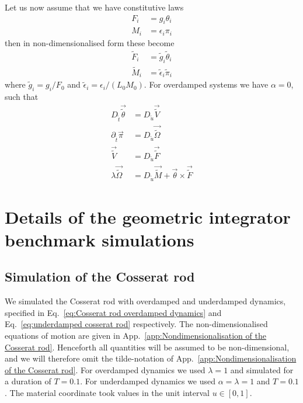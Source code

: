 \documentclass[]{cam-thesis}
\begin{document}
Let us now assume that we have constitutive laws
\begin{align*}
F_{i} & =g_{i}\theta_{i}\\
M_{i} & =\epsilon_{i}\pi_{i}
\end{align*}
then in non-dimensionalised form these become
\begin{align*}
\tilde{F}_{i} & =\tilde{g}_{i}\tilde{\theta}_{i}\\
\tilde{M}_{i} & =\tilde{\epsilon}_{i}\tilde{\pi}_{i}
\end{align*}
where $\tilde{g}_{i}=g_{i}/F_{0}$ and $\tilde{\epsilon}_{i}=\epsilon_{i}/(L_{0}M_{0})$. For overdamped systems we have $\alpha=0$, such that
\begin{align}
D_{\tilde{t}}\vec{\tilde{\theta}} & =D_{\tilde{u}}\vec{\tilde{V}}\\
\partial_{\tilde{t}}\vec{\pi} & =D_{\tilde{u}}\vec{\tilde{\Omega}}\\
\vec{\tilde{V}} & =D_{\tilde{u}}\vec{\tilde{F}}\nonumber \\
\lambda\vec{\tilde{\Omega}} & =D_{\tilde{u}}\vec{\tilde{M}}+\vec{\theta}\times\vec{\tilde{F}}
\end{align}



\chapter{Details of the geometric integrator benchmark simulations}

\section{Simulation of the Cosserat rod}

We simulated the Cosserat rod with overdamped and underdamped dynamics, specified in Eq.~\ref{eq:Cosserat rod overdamped dynamics} and Eq.~\ref{eq:underdamped cosserat rod} respectively. The non-dimensionalised equations of motion are given in App.~\ref{app:Nondimensionalisation of the Cosserat rod}. Henceforth all quantities will be assumed to be non-dimensional, and we will therefore omit the tilde-notation of App.~\ref{app:Nondimensionalisation of the Cosserat rod}. For overdamped dynamics we used $\lambda = 1$ and simulated for a duration of $T = 0.1$. For underdamped dynamics we used $\alpha = \lambda = 1$ and $T = 0.1$. The material coordinate took values in the unit interval $u \in [0,1]$.
\end{document}
